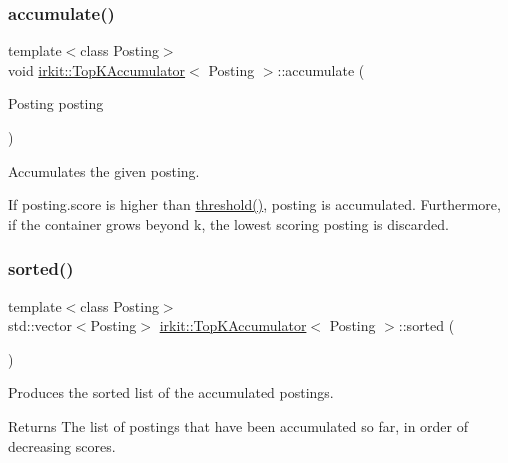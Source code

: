 \subsubsection{\texorpdfstring{accumulate()}{accumulate()}}
{\footnotesize\ttfamily template$<$class Posting$>$ \\
void \hyperlink{classirkit_1_1TopKAccumulator}{irkit\+::\+Top\+K\+Accumulator}$<$ Posting $>$\+::accumulate (\begin{DoxyParamCaption}\item[{Posting}]{posting }\end{DoxyParamCaption})\hspace{0.3cm}{\ttfamily [inline]}}



Accumulates the given posting. 

If {\ttfamily posting.\+score} is higher than \hyperlink{classirkit_1_1TopKAccumulator_abe812895292f04ad6cdcebe3f0864d30}{threshold()}, {\ttfamily posting} is accumulated. Furthermore, if the container grows beyond {\ttfamily k}, the lowest scoring posting is discarded. \mbox{\label{classirkit_1_1TopKAccumulator_adde0cfe7ba7dc26ca2cc55422b2351fa}} 
\subsubsection{\texorpdfstring{sorted()}{sorted()}}
{\footnotesize\ttfamily template$<$class Posting$>$ \\
std\+::vector$<$Posting$>$ \hyperlink{classirkit_1_1TopKAccumulator}{irkit\+::\+Top\+K\+Accumulator}$<$ Posting $>$\+::sorted (\begin{DoxyParamCaption}{ }\end{DoxyParamCaption})\hspace{0.3cm}{\ttfamily [inline]}}



Produces the sorted list of the accumulated postings. 

\begin{DoxyReturn}{Returns}
The list of postings that have been accumulated so far, in order of decreasing scores. 
\end{DoxyReturn}
\mbox{\label{classirkit_1_1TopKAccumulator_abe812895292f04ad6cdcebe3f0864d30}} 
